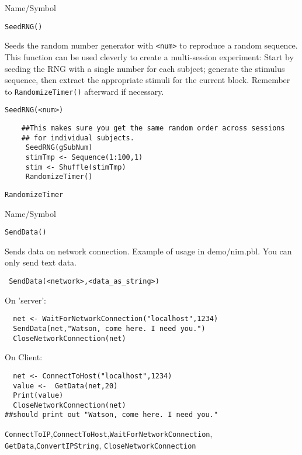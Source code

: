 \rl


\begin{desc}{Name/Symbol}
\item[Name/Symbol]   \verb+SeedRNG()+

\item[Description] Seeds the random number generator with \verb+<num>+
  to reproduce a random sequence.  This function can be used cleverly
  to create a multi-session experiment: Start by seeding the RNG with
  a single number for each subject; generate the stimulus sequence,
  then extract the appropriate stimuli for the current block. Remember
  to \verb+RandomizeTimer()+ afterward if necessary.

\item[Usage] 
\begin{verbatim}
SeedRNG(<num>) 
\end{verbatim}

\item[Example]	

\begin{verbatim}
    ##This makes sure you get the same random order across sessions
    ## for individual subjects.
     SeedRNG(gSubNum)
     stimTmp <- Sequence(1:100,1)
     stim <- Shuffle(stimTmp)
     RandomizeTimer()
\end{verbatim}

\item[See Also]	
     \verb+RandomizeTimer+
\end{desc}

\rl

\begin{desc}{Name/Symbol}
\item[Name/Symbol]	\verb+SendData()+

\item[Description]	Sends data on network connection.  Example of
  usage in demo/nim.pbl. You can only send text data.

\item[Usage]
\begin{verbatim}
 SendData(<network>,<data_as_string>)
\end{verbatim}

\item[Example]	

On 'server':
\begin{verbatim}
  net <- WaitForNetworkConnection("localhost",1234)
  SendData(net,"Watson, come here. I need you.")
  CloseNetworkConnection(net)
\end{verbatim}
On Client:
\begin{verbatim}
  net <- ConnectToHost("localhost",1234)
  value <-  GetData(net,20)
  Print(value)
  CloseNetworkConnection(net)
##should print out "Watson, come here. I need you."
\end{verbatim}
\item[See Also]
  \verb+ConnectToIP+,\verb+ConnectToHost+,\verb+WaitForNetworkConnection+,
   \verb+GetData+,\verb+ConvertIPString+, \verb+CloseNetworkConnection+
\end{desc}

